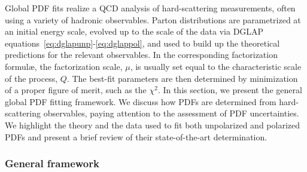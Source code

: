Global PDF fits realize a QCD analysis of hard-scattering measurements,
often using a variety of hadronic observables.
%
Parton distributions are parametrized at an initial energy scale, 
evolved up to the scale of the data via DGLAP 
equations~\eqref{eq:dglapunp}-\eqref{eq:dglappol}, and used to build up the 
theoretical predictions for the relevant observables.
%
In the corresponding factorization formul\ae, the factorization scale, $\mu$,
is usually set equal to the characteristic scale of the process, $Q$.
%
The best-fit parameters are then determined by minimization of a proper figure
of merit, such as the $\chi^2$.
%
In this section, we present the general global PDF fitting framework.
%
We discuss how PDFs are determined from hard-scattering observables,
paying attention to the assessment of PDF uncertainties.
%
We highlight the theory and the data used to fit both unpolarized and 
polarized PDFs and present a brief review of their state-of-the-art 
determination.

\subsubsection{General framework}
\label{sec:genframework}

